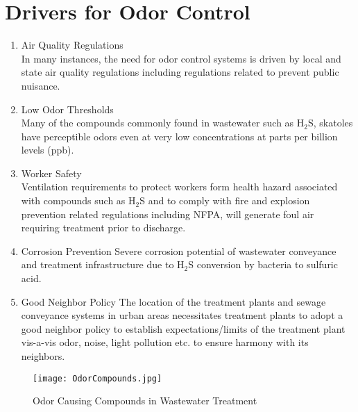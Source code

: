 \section{Drivers for Odor Control}
\begin{enumerate}
\item Air Quality Regulations\\
In many instances, the need for odor control systems is driven by local and state air quality regulations including regulations related to prevent public nuisance.
\item Low Odor Thresholds\\
Many of the compounds commonly found in wastewater such as H$_2$S, skatoles have perceptible odors even at very low concentrations at parts per billion levels (ppb).
\item Worker Safety\\
Ventilation requirements to protect workers form health hazard associated with compounds such as H$_2$S and to comply with fire and explosion prevention related regulations including NFPA, will generate foul air requiring treatment prior to discharge.
\item Corrosion Prevention
Severe corrosion potential of wastewater conveyance and treatment infrastructure due to H$_2$S conversion by bacteria to sulfuric acid.
\item Good Neighbor Policy
The location of the treatment plants and sewage conveyance systems in urban areas necessitates treatment plants to adopt a good neighbor policy to establish expectations/limits of the treatment plant vis-a-vis odor, noise, light pollution etc. to ensure harmony with its neighbors.
\end{enumerate}

\afterpage{\clearpage}
				\begin{sidewaysfigure}[!hp]
					\begin{center}
						\texttt{[image: OdorCompounds.jpg]}\\
						\caption{Odor Causing Compounds in Wastewater Treatment}
					\end{center}
				\end{sidewaysfigure}
